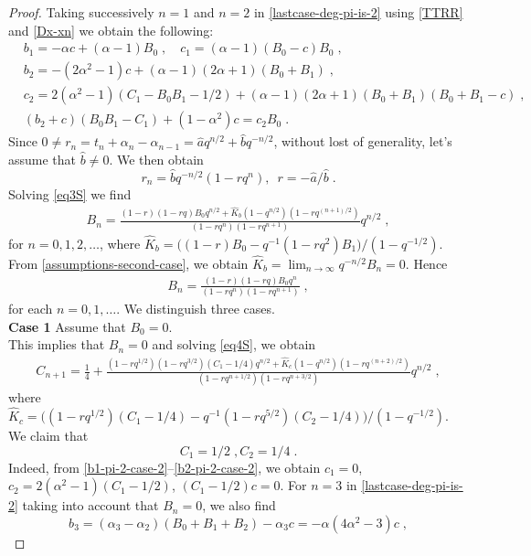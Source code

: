 \documentclass{amsart}
\theoremstyle{remark}
\numberwithin{equation}{section}
\begin{document}
\begin{proof}
Taking successively $n=1$ and $n=2$ in \eqref{lastcase-deg-pi-is-2} using \eqref{TTRR} and \eqref{Dx-xn} we obtain the following:
\begin{align}
&b_1=-\alpha c+(\alpha-1)B_0\;,\quad c_1=(\alpha-1)(B_0-c)B_0\;, \label{b1-pi-2-case-2}\\
&b_2=-(2\alpha^2-1)c+(\alpha -1)(2\alpha+1)(B_0+B_1)\;,\\ 
&c_2=2(\alpha^2-1)(C_1-B_0B_1-1/2)+(\alpha-1)(2\alpha+1)(B_0+B_1)(B_0+B_1-c)\;,\label{c2-lastcase}\\
&(b_2+c)(B_0B_1-C_1)+(1-\alpha^2)c=c_2B_0\;. \label{b2-pi-2-case-2}
\end{align}
Since $0\neq r_n=t_n+\alpha_n-\alpha_{n-1}=\widehat{a}q^{n/2}+\widehat{b}q^{-n/2}$, without lost of generality, let's assume that $\widehat{b}\neq 0$. We then obtain $$r_n=\widehat{b}q^{-n/2}(1-rq^n),\;~r=-\widehat{a}/\widehat{b}\;.$$ 
Solving \eqref{eq3S} we find
\begin{align*}
B_n =\frac{(1-r)(1-rq)B_0q^{n/2} +\widehat{K}_b(1-q^{n/2})(1-rq^{(n+1)/2})}{(1-r q^{n})(1-rq^{n+1})}q^{n/2}\; ,
\end{align*}
for $n=0,1,2,\ldots$, where $\widehat{K}_b=\big((1-r)B_0 -q^{-1}(1-rq^2)B_1\big)/(1-q^{-1/2})$. From \eqref{assumptions-second-case}, we obtain $\widehat{K}_b=\lim_{n\rightarrow \infty}q^{-n/2}B_n=0$. Hence
\begin{align}\label{first-Bn-pi-2-a}
B_n =\frac{(1-r)(1-rq)B_0q^{n}}{(1-r q^{n})(1-rq^{n+1})}\; ,
\end{align}
for each $n=0,1,\ldots$. We distinguish three cases.\\
\textbf{Case 1} Assume that $B_0=0$.\\
This implies that $B_n=0$ and solving \eqref{eq4S}, we obtain
\begin{align}\label{first-Cn-pi-2-b-homo}
C_{n+1} =\frac{1}{4}+\frac{(1-rq^{1/2})(1-rq^{3/2})(C_1-1/4)q^{n/2} +\widehat{K}_c(1-q^{n/2})(1-rq^{(n+2)/2})}{(1-r q^{n+1/2})(1-rq^{n+3/2})}q^{n/2}\; ,
\end{align}
where $\widehat{K}_c=\Big((1-rq^{1/2})(C_1-1/4) -q^{-1}(1-rq^{5/2})(C_2-1/4)\Big)/(1-q^{-1/2})$.\\
We claim that $$C_1=1/2\;,C_2=1/4\;.$$
Indeed, from \eqref{b1-pi-2-case-2}--\eqref{b2-pi-2-case-2}, we obtain $c_1=0$, $c_2=2(\alpha^2-1)(C_1-1/2)$, $(C_1-1/2)c=0$. For $n=3$ in \eqref{lastcase-deg-pi-is-2} taking into account that $B_n=0$, we also find $$b_3=(\alpha_3-\alpha_2)(B_0+B_1+B_2)-\alpha_3 c=-\alpha(4\alpha^2-3)c\;,$$

\end{proof}
\end{document}
